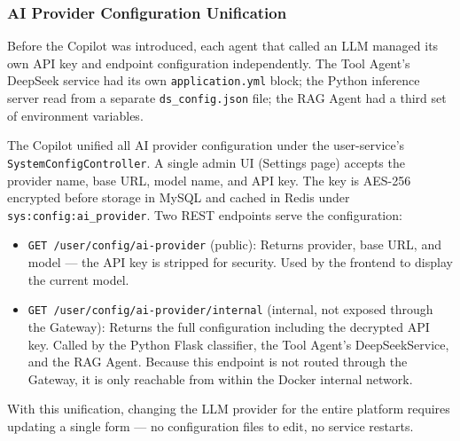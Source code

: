 \subsubsection{AI Provider Configuration Unification}

Before the Copilot was introduced, each agent that called an LLM managed its own API key and endpoint configuration independently. The Tool Agent's DeepSeek service had its own \texttt{application.yml} block; the Python inference server read from a separate \texttt{ds\_config.json} file; the RAG Agent had a third set of environment variables.

The Copilot unified all AI provider configuration under the user-service's \texttt{SystemConfigController}. A single admin UI (Settings page) accepts the provider name, base URL, model name, and API key. The key is AES-256 encrypted before storage in MySQL and cached in Redis under \texttt{sys:config:ai\_provider}. Two REST endpoints serve the configuration:

\begin{itemize}
  \item \texttt{GET /user/config/ai-provider} (public): Returns provider, base URL, and model --- the API key is stripped for security. Used by the frontend to display the current model.
  \item \texttt{GET /user/config/ai-provider/internal} (internal, not exposed through the Gateway): Returns the full configuration including the decrypted API key. Called by the Python Flask classifier, the Tool Agent's DeepSeekService, and the RAG Agent. Because this endpoint is not routed through the Gateway, it is only reachable from within the Docker internal network.
\end{itemize}

With this unification, changing the LLM provider for the entire platform requires updating a single form --- no configuration files to edit, no service restarts.

\newpage

